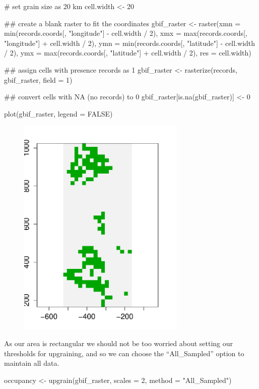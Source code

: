 \documentclass{article}[12pt, a4paper]
\begin{document}
\begin{Schunk}
\begin{Sinput}
# set grain size as 20 km
cell.width <- 20

## create a blank raster to fit the coordinates
gbif_raster <- raster(xmn = min(records.coords[, "longitude"] - cell.width / 2),
                      xmx = max(records.coords[, "longitude"] + cell.width / 2),
                      ymn = min(records.coords[, "latitude"] - cell.width / 2),
                      ymx = max(records.coords[, "latitude"] + cell.width / 2),
                      res = cell.width)
                      
## assign cells with presence records as 1
gbif_raster <- rasterize(records, gbif_raster, field = 1)

## convert cells with NA (no records) to 0
gbif_raster[is.na(gbif_raster)] <- 0

plot(gbif_raster, legend = FALSE)
\end{Sinput}
\end{Schunk}

\begin{figure}[!ht]
\centering
\includegraphics[width=8cm]{Downscaling-downscale32}
\end{figure}

As our area is rectangular we should not be too worried about setting our thresholds for upgraining, and so we can choose the “All\_Sampled” option to maintain all data.

\begin{Schunk}
\begin{Sinput}
occupancy <- upgrain(gbif_raster,
                     scales = 2,
                     method = "All_Sampled")
\end{Sinput}
\end{Schunk}
\end{document}
